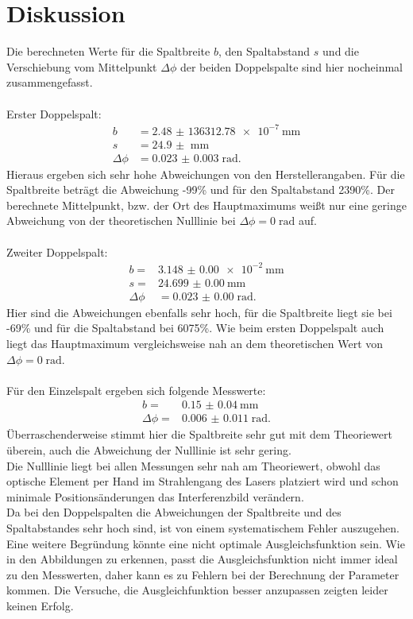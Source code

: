 \section{Diskussion}
\label{sec:Diskussion}
Die berechneten Werte für die Spaltbreite $b$, den Spaltabstand $s$ und die
Verschiebung vom Mittelpunkt $\Delta \phi$ der beiden
Doppelspalte sind hier nocheinmal zusammengefasst.\\
\\
Erster Doppelspalt:
\begin{align*}
  b &=\SI{2.48(13631278)e-7}{\mm}\\
  s &=\SI{24.9(0)}{\mm}\\
  \Delta \phi &=\SI{0.023(3)}\; \text{rad}.
\end{align*}
Hieraus ergeben sich sehr hohe Abweichungen von den Herstellerangaben. Für die
Spaltbreite beträgt die Abweichung -99\% und für den Spaltabstand 2390\%.
Der berechnete Mittelpunkt, bzw. der Ort des Hauptmaximums weißt nur eine
geringe Abweichung von der theoretischen Nulllinie bei $\Delta \phi = 0\; \text{rad}$ auf.\\
\\

Zweiter Doppelspalt:
\begin{align*}
  b =&\SI{3.148(0)e-2}{\mm}\\
  s =&\SI{24.699(0)}{\mm}\\
  \Delta \phi &=\SI{0.023(0)}\; \text{rad}.
\end{align*}
Hier sind die Abweichungen ebenfalls sehr hoch, für die Spaltbreite liegt sie bei
-69\% und für die Spaltabstand bei 6075\%. Wie beim ersten Doppelspalt auch
liegt das Hauptmaximum vergleichsweise nah an dem theoretischen Wert von
$ \Delta \phi= 0\;\text{rad}$.\\
\\
Für den Einzelspalt ergeben sich folgende Messwerte:
\begin{align*}
  b =&\SI{0.15(4)}{\mm}\\
  \Delta \phi=& \SI{0.006(11)}\; \text{rad}.
\end{align*}
Überraschenderweise stimmt hier die Spaltbreite sehr gut mit dem Theoriewert überein, auch
die Abweichung der Nulllinie ist sehr gering.
\\
Die Nulllinie liegt bei allen Messungen sehr nah am Theoriewert, obwohl das
optische Element per Hand im Strahlengang des Lasers platziert wird und schon minimale
Positionsänderungen das Interferenzbild verändern.\\
Da bei den Doppelspalten die Abweichungen der Spaltbreite und des Spaltabstandes
sehr hoch sind, ist von einem systematischem Fehler auszugehen. Eine weitere
Begründung könnte eine nicht optimale Ausgleichsfunktion sein. Wie in den Abbildungen
zu erkennen, passt die Ausgleichsfunktion nicht immer ideal zu den Messwerten, daher
kann es zu Fehlern bei der Berechnung der Parameter kommen. Die Versuche, die Ausgleichfunktion
besser anzupassen zeigten leider keinen Erfolg.
